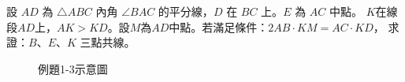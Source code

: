 \documentclass[12pt]{article}
\newif\ifshow
\begin{document}
\newpage
\fi
\begin{mybox}[例題\thesection-3]{6em}{1em}{1em}
    設 $AD$ 為 $\triangle ABC$ 內角 $\angle BAC$ 的平分線，$D$ 在 $BC$ 上。$E$ 為 $AC$ 中點。
    $K$在線段$AD$上，$AK>KD$。設$M$為$AD$中點。若滿足條件：$2AB \cdot KM = AC \cdot KD$，
    求證：$B$、$E$、$K$ 三點共線。
    \begin{figure}[H]
        \centering 
        \caption{例題1-3示意圖}
        \label{fig:coline_s1-5}
    \end{figure}
\end{mybox}
\ifshow
\begin{mybox}[解]{3em}{1em}{1em}
    題目中的等式可等價變換為：
    \begin{align}
        &AB\cdot\left(AK-KD\right)=AC\cdot KD\notag\\
        \Leftrightarrow\quad&AB\cdot AK=KD\left(AB+AC\right)\notag\\
        \Leftrightarrow\quad&\frac{AK}{KD}=\frac{AB+AC}{AB}\label{eq:formula_1}
    \end{align}
    由角平分線定理可得：
    \begin{equation*}
        \frac{AB+AC}{AB}=\frac{BC}{BD}\label{eq:bisctor_theorem}
    \end{equation*}
    所以\eqref{eq:formula_1}等價於
    \begin{equation}
        \frac{AK}{KD}\cdot\frac{DB}{BC}=1\label{eq:formula_2}
    \end{equation}
    因為$E$是$AC$的中點，所以有
    \begin{equation*}
        \frac{AK}{KD}\cdot\frac{DB}{BC}\cdot\frac{CE}{EA}=1
    \end{equation*}
    根據梅涅勞斯定理可知$B$、$E$、$K$三點共線。
\end{mybox}
\fi
\newpage
\end{document}

